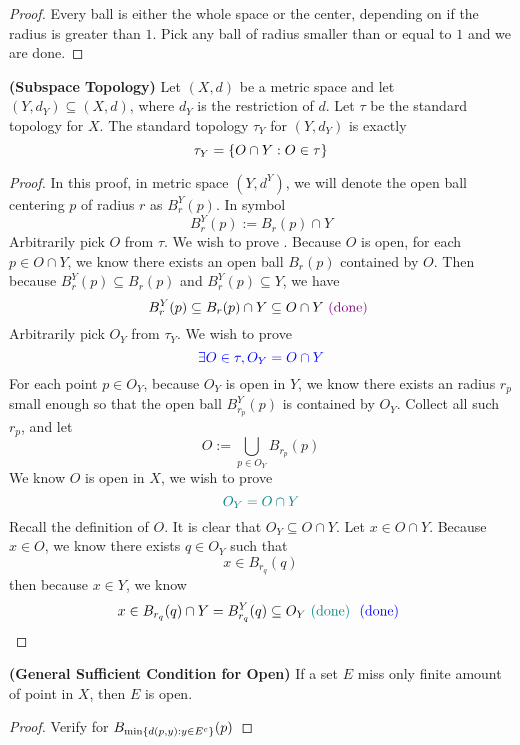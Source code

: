 \documentclass{report}
\begin{document}
\begin{proof}
Every ball is either the whole space or the center, depending on if the radius is greater than $1$. Pick any ball of radius smaller than or equal to  $1$ and we are done.
\end{proof}
\begin{theorem}
\label{2.3.11}
\textbf{(Subspace Topology)} Let $(X,d)$ be a metric space and let $(Y,d_Y)\subseteq (X,d)$, where $d_Y$ is the restriction of $d$. Let $\tau$ be the standard topology for $X$. The standard topology $\tau_Y$ for $(Y,d_Y)$ is exactly
\begin{equation}
\tau_Y=\{ O\cap Y: O\in \tau \}
\end{equation}
\end{theorem}
\begin{proof}
In this proof, in metric space $(Y,d^Y)$, we will denote the open ball centering $p$ of radius $r$ as $B^Y_r(p)$. In symbol
\begin{equation}
B_r^Y(p):=B_r(p)\cap Y
\end{equation}
Arbitrarily pick $O$ from $\tau$. We wish to prove . Because $O$ is open, for each $p\in O\cap Y$, we know there exists an open ball  $B_r(p)$ contained by $O$. Then because $B_r^Y(p)\subseteq B_r(p)$ and $B_r^Y(p)\subseteq Y$, we have
\begin{equation}
B_r^Y(p)\subseteq B_r(p)\cap Y\subseteq O\cap Y\textcolor{violet}{\text{ (done) }}
\end{equation}
Arbitrarily pick $O_Y$ from  $\tau_Y$. We wish to prove
\begin{equation}
\textcolor{blue}{\exists O\in \tau, O_Y=O\cap Y}
\end{equation}
For each point $p\in O_Y$, because  $O_Y$ is open in $Y$, we know there exists an radius $r_p$ small enough so that the open ball $B_{r_p}^Y(p)$ is contained by $O_Y$. Collect all such $r_p$, and let
\begin{equation}
O:=\bigcup_{p\in O_Y}B_{r_p}(p)
\end{equation}
We know $O$ is open in  $X$, we wish to prove
 \begin{equation}
\textcolor{teal}{O_Y=O\cap Y}
\end{equation}
Recall the definition of $O$. It is clear that $O_Y\subseteq O\cap Y$. Let $x\in O\cap Y$. Because $x\in O$, we know there exists $q\in O_Y$ such that
\begin{equation}
x\in B_{r_q}(q)
\end{equation}
then because $x\in Y$, we know
\begin{equation}
x\in B_{r_q}(q)\cap Y=B_{r_q}^Y(q)\subseteq O_Y\textcolor{teal}{\text{ (done) }} \textcolor{blue}{\text{ (done) }}
\end{equation}
\end{proof}
\begin{theorem}
\label{2.3.12}
\textbf{(General Sufficient Condition for Open)} If a set $E$ miss only finite amount of point in $X$, then  $E$ is open.
\end{theorem}
\begin{proof}
Verify for  $B_{\min \{ d(p,y):y\in E^c \}}(p)$
\end{proof}
\end{document}
